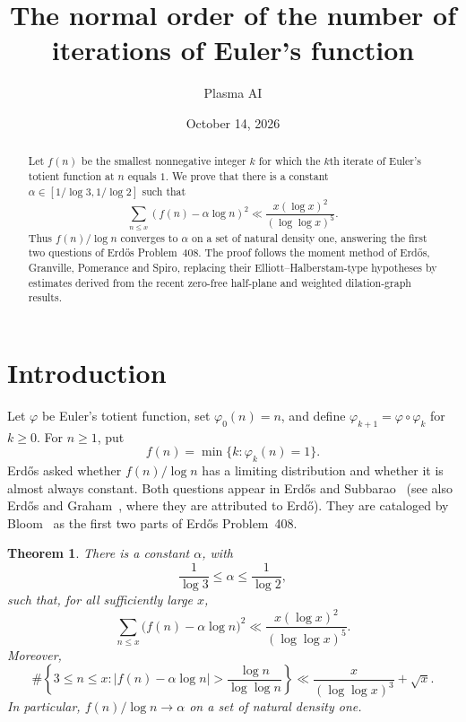 \documentclass[10pt]{article}
\title{The normal order of the number of iterations of Euler's function}
\author{Plasma AI}
\date{October 14, 2026}
\newtheorem{thm}{Theorem}[section]
\begin{document}
\maketitle

\begin{abstract}
Let $f(n)$ be the smallest nonnegative integer $k$ for which the $k$th iterate of Euler's totient function at $n$ equals $1$. We prove that there is a constant $\alpha\in[1/\log 3,1/\log 2]$ such that
\[
 \sum_{n\leq x}(f(n)-\alpha\log n)^2\ll\frac{x(\log x)^2}{(\log\log x)^5}.
\]
Thus $f(n)/\log n$ converges to $\alpha$ on a set of natural density one, answering the first two questions of Erd\H{o}s Problem~408. The proof follows the moment method of Erd\H{o}s, Granville, Pomerance and Spiro, replacing their Elliott--Halberstam-type hypotheses by estimates derived from the recent zero-free half-plane and weighted dilation-graph results.
\end{abstract}

\section{Introduction}

Let $\varphi$ be Euler's totient function, set $\varphi_0(n)=n$, and define $\varphi_{k+1}=\varphi\circ\varphi_k$ for $k\geq0$. For $n\geq1$, put
\[
 f(n)=\min\{k:\varphi_k(n)=1\}.
\]
Erd\H{o}s asked whether $f(n)/\log n$ has a limiting distribution and whether it is almost always constant. Both questions appear in Erd\H{o}s and Subbarao~\cite[p.~125]{ES72} (see also Erd\H{o}s and Graham~\cite[pp.~80--81]{EG80}, where they are attributed to Erd\H{o}). They are cataloged by Bloom~\cite{Bloom} as the first two parts of Erd\H{o}s Problem~408.

\begin{thm}\label{thm:main}
There is a constant $\alpha$, with
\[
 \frac1{\log 3}\leq\alpha\leq\frac1{\log 2},
\]
such that, for all sufficiently large $x$,
\begin{equation}\label{eq:variance}
 \sum_{n\leq x}\bigl(f(n)-\alpha\log n\bigr)^2
 \ll \frac{x(\log x)^2}{(\log\log x)^5}.
\end{equation}
Moreover,
\begin{equation}\label{eq:exceptional}
 \#\left\{3\leq n\leq x:
  |f(n)-\alpha\log n|>\frac{\log n}{\log\log n}\right\}
 \ll \frac{x}{(\log\log x)^3}+\sqrt{x}.
\end{equation}
In particular, $f(n)/\log n\to\alpha$ on a set of natural density one.
\end{thm}
\end{document}
